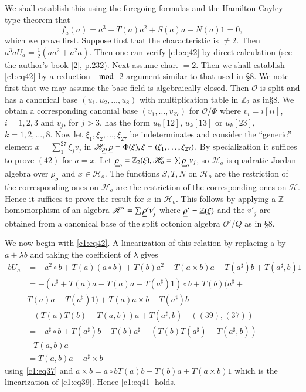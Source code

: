We shall establish this using the foregoing formulas and the
Hamil\-ton-Cayley type theorem that
\begin{equation*}
  f_a(a)=a^{3}-T(a)a^{2}+S(a)a-N(a)1=0,\tag{42}\label{c1:eq42}
\end{equation*}
which we prove first. Suppose first that the characteristic is $\neq
2$. Then\pageoriginale $a^{3}aU_a=\frac{1}{2}(aa^{2}+a^{2}a)$. Then
one can verify \eqref{c1:eq42} by direct calculation (see the author's book [2],
p.232). Next assume char. $=2$. Then we shall establish \eqref{c1:eq42} by a
reduction $\mod$ $2$ argument similar to that used in \S $8$. We note
first that we may assume the base field is algebraically closed. Then
$\mathcal{O}$ is split and has a canonical base $(u_1,u_2,\ldots,u_8)$
with multiplication table in $\mathbb{Z}_2$ as in\S $8$. We obtain a
corresponding canonial base $(v_1,\ldots,v_{27})$ for
$\mathcal{O}/\Phi$ where $v_i=i[ii]$, $i=1,2,3$ and $v_j$, for $j>3$,
has the form $u_k[12]$, $u_k[13]$ or $u_k[23]$, $k=1,2,\ldots,8$. Now
let $\xi_1, \xi_2,\ldots,\xi_{27}$ be indeterminates and consider the
``generic'' element $x=\sum\limits_1^{27}\xi_jv_j$ in
$\mathscr{H}_{\underline{\rho}},\underline{\rho}=\Phi(\xi),\xi=(\xi_1,\ldots,\xi_{27})$. By
specialization it suffices to prove $(42)$ for $a=x$. Let
$\underline{\rho}_o=\mathbb{Z}_2(\xi),\mathscr{H}_o=\sum \underline{\rho}_o v_j$, so
$\mathscr{H}_o$ is quadratic Jordan algebra over $\underline{\rho}_o$ and
$x\in \mathscr{H}_o$. The functions $S,T,N$ on $\mathscr{H}_o$
are the restriction of the corresponding ones on $\mathscr{H}_o$ are
the restriction of the corresponding ones on $\mathscr{H}$. Hence it
suffices to prove the result for $x$ in $\mathscr{H}_o$. This follows
by applying a $\mathbb{Z}$ -homomorphism of an algebra
$\mathscr{H}'=\sum\underline{\rho}'v'_j$ where $\underline{\rho}'=\mathbb{Z}(\xi)$
and the $v'_j$ are obtained from a canonical base of the split
octonion algebra $\mathscr{O}'/Q$ as in \S $8$.

We now begin with \eqref{c1:eq42}. A linearization of this relation by 
replacing a by $a+\lambda b$ and taking the coefficient of $\lambda$ gives
\begin{align*}
  bU_a&=-a^{2}\circ b+T(a)(a\circ b)+T(b) a^{2}-T(a\times
  b)a-T(a^{\sharp})b+T(a^{\sharp},b)1\\
  &=-(a^{\sharp}+T(a)a-T(a)a-T(a^{\sharp})1)\circ b+T(b)(a^{\sharp}+\\
  &T(a)a-T(a^{\sharp})1)+T(a)a\times b -T(a^{\sharp})b\\
  &-(T(a)T(b)-T(a,b))a+T(a^{\sharp},b)\quad ((39), (37))\\
  &=-a^{\sharp}\circ b
  +T(a^{\sharp})b+T(b)a^{\sharp}-(T(b)T(a^{\sharp})-T(a^{\sharp},b))\\
  &+T(a,b)a\\
  &=T(a,b)a-a^{\sharp}\times b
\end{align*}\pageoriginale
using \eqref{c1:eq37} and $a\times b=a\circ b T(a)b-T(b)a+T(a\times
b)1$ which is the linearization of \eqref{c1:eq39}. Hence \eqref{c1:eq41} holds.

